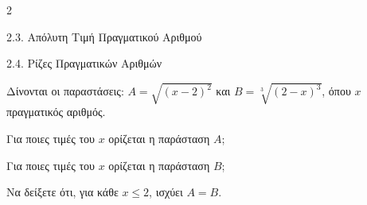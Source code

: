 \begin{ylh}{2}
    \item 2.3. Απόλυτη Τιμή Πραγματικού Αριθμού
    \item 2.4. Ρίζες Πραγματικών Αριθμών
\end{ylh}
Δίνονται οι παραστάσεις: $A = \sqrt{(x - 2)^2}$ και $B = \sqrt[3]{(2 - x)^3}$, όπου $x$ πραγματικός αριθμός.

\begin{alist}
\item Για ποιες τιμές του $x$ ορίζεται η παράσταση $A$; 
\item Για ποιες τιμές του $x$ ορίζεται η παράσταση $B$; 
\item Να δείξετε ότι, για κάθε $x \le 2$, ισχύει $A = B$. 
\end{alist}

